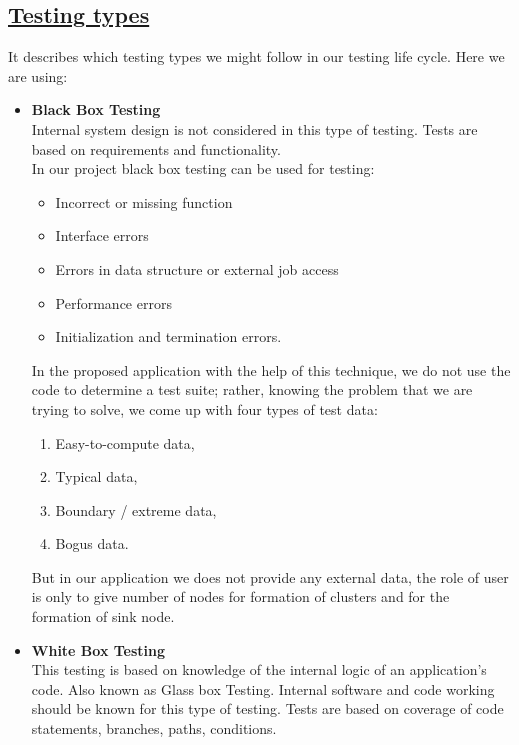 \subsection*{\underline{Testing types}}
It describes which testing types we might follow in our testing life cycle. Here we are using:
\begin{itemize}
\item \textbf{Black Box Testing}\\
Internal system design is not considered in this type of testing. Tests are based on requirements and functionality.\\
 In our project black box testing can be used for testing:


\begin{itemize}
\item Incorrect or missing function
\item	Interface errors
\item	Errors in data structure or external job access
\item	Performance errors
\item	Initialization and termination errors.
 
\end{itemize}

In the proposed application with the help of this technique, we do not use the code to determine a test suite; rather, knowing the problem that we are trying to solve, we come up with four types of test data: 
\begin{enumerate}
\item	Easy-to-compute data,
\item	Typical data,
\item	Boundary / extreme data,
\item	Bogus data.

\end{enumerate}
But in our application we does not provide any external data, the role of user is only to give number of nodes for formation of clusters and for the formation of sink node.


\item \textbf{White Box Testing}\\
This testing is based on knowledge of the internal logic of an application’s code. Also known as Glass box Testing. Internal software and code working should be known for this type of testing. Tests are based on coverage of code statements, branches, paths, conditions.\\


\end{itemize}
